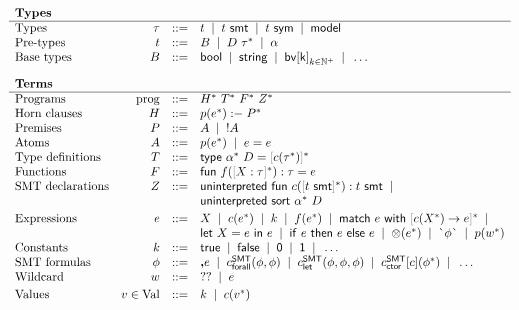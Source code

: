 \documentclass[acmsmall,screen,nonacm]{acmart}
\newcommand{\BNFALT}{\;\;|\;\;}
\theoremstyle{definition}
\begin{document}
\begin{figure}[t]
  \[ \begin{array}{lrcl}
    \multicolumn{4}{l}{\textbf{Types}} \\ \hline
    \text{Types}        & \tau   &::=& t \BNFALT \smt{t} \BNFALT \sym{t} \BNFALT \mathsf{model} \\
    \text{Pre-types}    & t      &::=& B \BNFALT D ~ \tau^* \BNFALT \alpha \\
    \text{Base types}   & B      &::=& \bool \BNFALT \strtype \BNFALT \bv{k}_{k \in {\mathbb{N}^+}} \BNFALT
                                     \dots\\[1em]
    
    \multicolumn{4}{l}{\textbf{Terms}} \\ \hline

    \text{Programs}     & \prog &::=& H^*~T^*~F^*~Z^* \\
    \text{Horn clauses} & H     &::=& p(e^*) \horn P^* \\
    \text{Premises}     & P     &::=& A \BNFALT \mathord{!}A \\
    \text{Atoms}        & A     &::=& p(e^*) \BNFALT e=e \\
    \text{Type definitions} & T &::=& \mathsf{type}~\alpha^*~D = \grayb{c(\tau^*)}^*\\
    \text{Functions}    & F     &::=& \mathsf{fun}~f(\grayb{X : \tau}^*) : \tau = e \\
    \text{SMT declarations} & Z &::=& \mathsf{uninterpreted~fun}~c(\grayb{\smt{t}}^*) : \smt{t} \BNFALT\\
                            &   &   & \mathsf{uninterpreted~sort}~\alpha^*~D \\[0.25em]
    \text{Expressions}  & e     &::=& X \BNFALT c(e^*) \BNFALT k \BNFALT f(e^*) \BNFALT
                                      \match{e}{\grayb{c(X^*) \rightarrow e}^*} \BNFALT \\
                        &       &   & \letin{X}{e}{e} \BNFALT \ite{e}{e}{e} \BNFALT
                                      \operation{e^*} \BNFALT \qq{\phi} \BNFALT p(w^*) \\
    \text{Constants}    & k     &::=& \mathsf{true} \BNFALT \mathsf{false} \BNFALT \mathsf{0} \BNFALT
                                      \mathsf{1} \BNFALT \dots \\
    \text{SMT formulas} & \phi  &::=& \unq{e} \BNFALT \cFORALL(\phi, \phi) \BNFALT \cLET(\phi, \phi, \phi) \BNFALT
                                      \cCTOR[c](\phi^*) \BNFALT \dots \\
    \text{Wildcard}     & w     &::=& \wildcard \BNFALT e \\[0.25em]
    \text{Values}       & v \in \mathrm{Val}     &::=& k \BNFALT c(v^*) \\[1em]


\end{array}\]
\end{figure}
\end{document}
